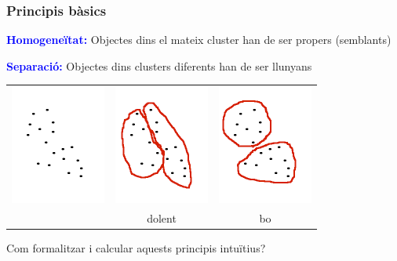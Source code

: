 \documentclass[12pt,t]{beamer}
\newcommand{\blue}[1]{\textcolor{blue}{#1}}
\theoremstyle{plain}
\theoremstyle{definition}
\begin{document}
\begin{frame}
\frametitle{Principis bàsics}

\blue{\bf Homogeneïtat:} Objectes dins el mateix cluster han de ser propers (semblants)
\medskip

\blue{\bf Separació:} Objectes dins clusters diferents han de ser llunyans
\vspace*{-4ex}

\begin{center}
\begin{tabular}{ccc}
\includegraphics[width=0.3 \linewidth]{cluster1.pdf}
&
\includegraphics[width=0.3 \linewidth]{cluster1dolent.pdf}
&
\includegraphics[width=0.3 \linewidth]{cluster1bo.pdf}
\\ & dolent & bo
\end{tabular}
\end{center}
Com formalitzar i calcular aquests principis intuïtius?

\end{frame}
\end{document}
